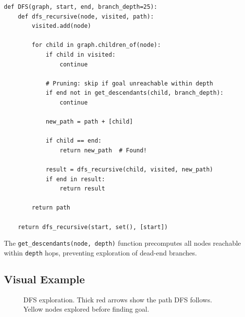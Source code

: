 \documentclass[11pt,a4paper]{report}
\begin{document}
\begin{lstlisting}[style=pythonstyle, caption={DFS with descendant filtering}]
def DFS(graph, start, end, branch_depth=25):
    def dfs_recursive(node, visited, path):
        visited.add(node)
        
        for child in graph.children_of(node):
            if child in visited:
                continue
            
            # Pruning: skip if goal unreachable within depth
            if end not in get_descendants(child, branch_depth):
                continue
            
            new_path = path + [child]
            
            if child == end:
                return new_path  # Found!
            
            result = dfs_recursive(child, visited, new_path)
            if end in result:
                return result
        
        return path
    
    return dfs_recursive(start, set(), [start])
\end{lstlisting}

The \texttt{get\_descendants(node, depth)} function precomputes all nodes reachable within \texttt{depth} hops, preventing exploration of dead-end branches.

\subsection{Visual Example}

\begin{figure}[h]
\centering
{}
\caption{DFS exploration. Thick red arrows show the path DFS follows. Yellow nodes explored before finding goal.}
\label{fig:dfs_tree}
\end{figure}
\end{document}

